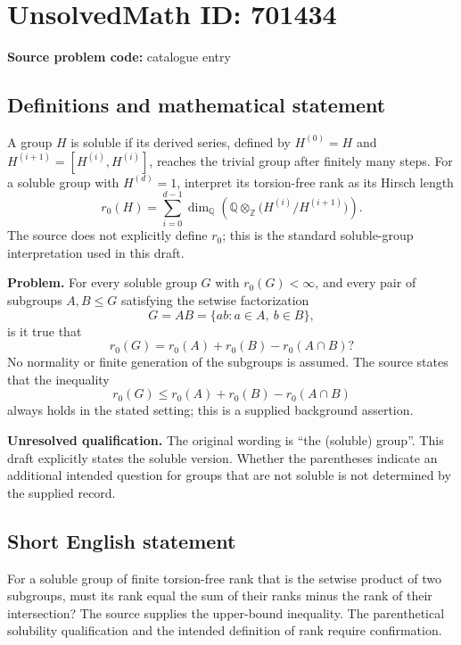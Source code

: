 \documentclass[11pt]{article}
\newcommand{\Z}{\mathbb{Z}}
\newcommand{\Q}{\mathbb{Q}}
\begin{document}
\section*{UnsolvedMath ID: 701434}
\textbf{Source problem code:} catalogue entry
\subsection{Definitions and mathematical statement}
A group \(H\) is soluble if its derived series, defined by \(H^{(0)}=H\) and \(H^{(i+1)}=[H^{(i)},H^{(i)}]\), reaches the trivial group after finitely many steps. For a soluble group with \(H^{(d)}=1\), interpret its torsion-free rank as its Hirsch length
\[
r_0(H)=\sum_{i=0}^{d-1}\dim_{\Q}\!\left(\Q\otimes_{\Z}\bigl(H^{(i)}/H^{(i+1)}\bigr)\right).
\]
The source does not explicitly define \(r_0\); this is the standard soluble-group interpretation used in this draft.

\textbf{Problem.} For every soluble group \(G\) with \(r_0(G)<\infty\), and every pair of subgroups \(A,B\leq G\) satisfying the setwise factorization
\[
G=AB=\{ab:a\in A,\ b\in B\},
\]
is it true that
\[
r_0(G)=r_0(A)+r_0(B)-r_0(A\cap B)?
\]
No normality or finite generation of the subgroups is assumed. The source states that the inequality
\[
r_0(G)\leq r_0(A)+r_0(B)-r_0(A\cap B)
\]
always holds in the stated setting; this is a supplied background assertion.

\textbf{Unresolved qualification.} The original wording is ``the (soluble) group''. This draft explicitly states the soluble version. Whether the parentheses indicate an additional intended question for groups that are not soluble is not determined by the supplied record.
\subsection{Short English statement}
For a soluble group of finite torsion-free rank that is the setwise product of two subgroups, must its rank equal the sum of their ranks minus the rank of their intersection? The source supplies the upper-bound inequality. The parenthetical solubility qualification and the intended definition of rank require confirmation.
\end{document}
